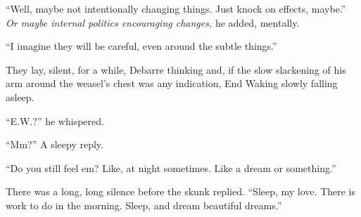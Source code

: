 ``Well, maybe not intentionally changing things. Just knock on effects, maybe.'' \emph{Or maybe internal politics encouraging changes,} he added, mentally.

``I imagine they will be careful, even around the subtle things.''

They lay, silent, for a while, Debarre thinking and, if the slow slackening of his arm around the weasel's chest was any indication, End Waking slowly falling asleep.

``E.W.?'' he whispered.

``Mm?'' A sleepy reply.

``Do you still feel em? Like, at night sometimes. Like a dream or something.''

There was a long, long silence before the skunk replied. ``Sleep, my love. There is work to do in the morning. Sleep, and dream beautiful dreams.''
